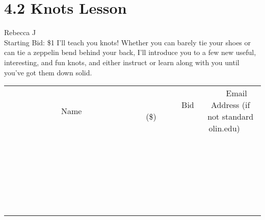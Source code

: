 \documentclass[11pt]{article}
\begin{document}
\section*{4.2 Knots Lesson}
Rebecca J
\\
Starting Bid: \$1
\newline
I'll teach you knots! Whether you can barely tie your shoes or can tie a zeppelin bend behind your back, I'll introduce you to a few new useful, interesting, and fun knots, and either instruct or learn along with you until you've got them down solid.
\\[6ex]
\begin{tabular}{c c c}
~~~~~~~~~~~~~Name~~~~~~~~~~~~~ & ~~~~~~~~~Bid (\$)~~~~~~~~~  & ~~~Email Address (if not standard olin.edu)~~~\\
 & & \\
\hline
 & & \\
\hline
 & & \\
\hline
 & & \\
\hline
 & & \\
\hline
 & & \\
\hline
 & & \\
\hline
 & & \\
\hline
 & & \\
\hline
 & & \\
\hline
 & & \\
\hline
 & & \\
\hline
 & & \\
\hline
 & & \\
\hline
 & & \\
\hline
 & & \\
\hline
 & & \\
\hline
 & & \\
\hline
 & & \\
\hline
 & & \\
\hline
 & & \\
\hline
 & & \\
\hline
 & & \\
\hline
 & & \\
\hline
 & & \\
\hline
 & & \\
\hline
\end{tabular}
\newpage
\end{document}
